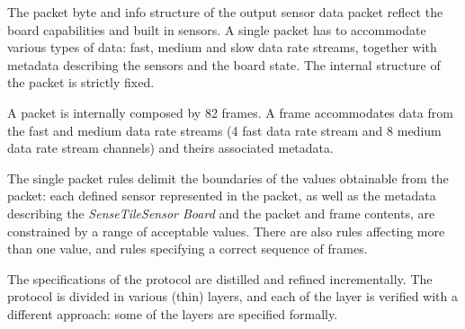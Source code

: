 \documentclass[english]{lni}
\newcommand{\ST}{\emph{SenseTile}\xspace}
\newcommand{\SB}{\emph{Sensor Board}\xspace}
\newcommand{\STSB}{\ST \SB\xspace}
\begin{document}
The packet byte and info structure of the output sensor data packet reflect the board capabilities and built in sensors. 
A single packet has to accommodate various types of data: fast, medium and slow data rate streams, together with metadata describing the sensors and the board state.
The internal structure of the packet is strictly fixed. 

A packet is internally composed by 82 frames. 
A frame accommodates data from the fast and medium data rate streams (4 fast data rate stream and 8 medium data rate stream channels) and theirs associated metadata.

The single packet rules delimit the boundaries of the values obtainable from the packet: each defined sensor represented in the packet, as well as the metadata describing the \STSB and the packet and frame contents, are constrained by a range of acceptable values.
There are also rules affecting more than one value, and rules specifying a correct sequence of frames.




The specifications of the protocol are distilled and refined incrementally.
The protocol is divided in various (thin) layers, and each of the layer is verified with a different approach: some of the layers are specified formally. 
\end{document}
